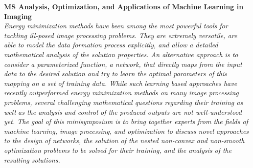   \noindent\textbf{MS Analysis, Optimization, and Applications of Machine Learning in Imaging}\\
  \textit{Energy minimization methods have been among the most powerful tools for tackling ill-posed image processing problems. They are extremely versatile, are able to model the data formation process explicitly, and allow a detailed mathematical analysis of the solution properties. An alternative approach is to consider a parameterized function, a network, that directly maps from the input data to the desired solution and try to learn the optimal parameters of this mapping on a set of training data. While such learning based approaches have recently outperformed energy minimization methods on many image processing problems, several challenging mathematical questions regarding their training as well as the analysis and control of the produced outputs are not well-understood yet. The goal of this minisymposium is to bring together experts from the fields of machine learning, image processing, and optimization to discuss novel approaches to the design of networks, the solution of the nested non-convex and non-smooth optimization problems to be solved for their training, and the analysis of the resulting solutions.} \\
    
